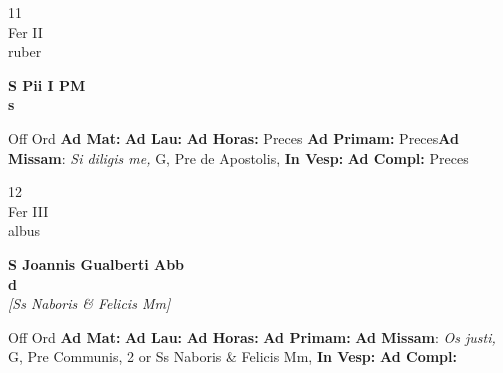 \documentclass[10pt, openany]{book}
\begin{document}
    \begin{center}
        \begin{minipage}{3.5in}
            \vspace{2em}
            \begin{minipage}{0.5in}
                {\Huge 11} \\
                {\normalsize Fer II} \\
                {\normalsize ruber}
            \end{minipage}
            \begin{minipage}{3.0in}
                \textbf{ \large S Pii I PM \\
                \textnormal{\normalsize s}} \\ 
            \end{minipage}
            \begin{justify}Off Ord
                \textbf{Ad Mat: }
                \textbf{Ad Lau: }
                \textbf{Ad Horas: }Preces
                \textbf{Ad Primam: }Preces\textbf{Ad Missam}: \textit{Si diligis me,} G, Pre de Apostolis,  
                \textbf{In Vesp: }
                \textbf{Ad Compl: }Preces
            \end{justify}
        \end{minipage}
    \end{center}

    \begin{center}
        \begin{minipage}{3.5in}
            \vspace{2em}
            \begin{minipage}{0.5in}
                {\Huge 12} \\
                {\normalsize Fer III} \\
                {\normalsize albus}
            \end{minipage}
            \begin{minipage}{3.0in}
                \textbf{ \large S Joannis Gualberti Abb \\
                \textnormal{\normalsize d}} \\ \textit{[Ss Naboris \& Felicis Mm]} \\ 
            \end{minipage}
            \begin{justify}Off Ord
                \textbf{Ad Mat: }
                \textbf{Ad Lau: }
                \textbf{Ad Horas: }
                \textbf{Ad Primam: }\textbf{Ad Missam}: \textit{Os justi,} G, Pre Communis, 2 or Ss Naboris \& Felicis Mm,  
                \textbf{In Vesp: }
                \textbf{Ad Compl: }
            \end{justify}
        \end{minipage}
    \end{center}
\end{document}
